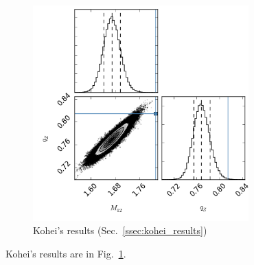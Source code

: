 \begin{figure}
\includegraphics[width=83mm]{figures/kohei_results.png}
  \caption{Kohei's results (Sec.~\ref{ssec:kohei_results})}
  \label{plot_kohei_results}
\end{figure}

Kohei's results are in Fig.~\ref{plot_kohei_results}.
